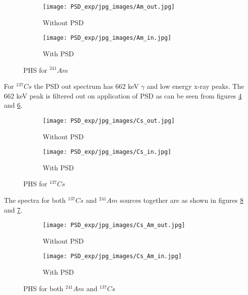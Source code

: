 \documentclass[10pt]{article}
\begin{document}
\begin{figure}[ht]
	\begin{subfigure}{0.5\textwidth}
		\centering
		\texttt{[image: PSD\_exp/jpg\_images/Am\_out.jpg]}         
		\caption{Without PSD}
		\label{Am_out}
	\end{subfigure}
	\begin{subfigure}{0.5\textwidth}
		\centering
		\texttt{[image: PSD\_exp/jpg\_images/Am\_in.jpg]}         
		\caption{With PSD}
		\label{Am_in}
		
	\end{subfigure}   
	\caption{PHS for $^{241}Am$}
\end{figure}

{For $^{137}Cs$ the PSD out spectrum has 662 keV $\gamma$ and low energy x-ray peaks. The 662 keV peak is filtered out on application of PSD as can be seen from figures \ref{Cs_out} and \ref{Cs_in}}.  
\begin{figure}[ht]
	\begin{subfigure}{0.5\textwidth}
		\centering
		\texttt{[image: PSD\_exp/jpg\_images/Cs\_out.jpg]}         
		\caption{Without PSD}
		\label{Cs_out}
	\end{subfigure}
	\begin{subfigure}{0.5\textwidth}
		\centering
		\texttt{[image: PSD\_exp/jpg\_images/Cs\_in.jpg]}         
		\caption{With PSD}
		\label{Cs_in}
		
	\end{subfigure}   
	\caption{PHS for $^{137}Cs$}
\end{figure}
The spectra for both $^{137}Cs$ and $^{241}Am$ sources together are as shown in figures \ref{Cs_Am_out} and \ref{Cs_Am_in}.  
\begin{figure}[ht]
	\begin{subfigure}{0.5\textwidth}
        \centering
        \texttt{[image: PSD\_exp/jpg\_images/Cs\_Am\_out.jpg]}         
        \caption{Without PSD}
        \label{Cs_Am_in}
     \end{subfigure}
	\begin{subfigure}{0.5\textwidth}
        \centering
        \texttt{[image: PSD\_exp/jpg\_images/Cs\_Am\_in.jpg]}         
        \caption{With PSD}
        \label{Cs_Am_out}
        
 \end{subfigure}   
 \caption{PHS for both $^{241}Am$ and $^{137}Cs$}
 \label{combinedAnalog}
\end{figure}
\end{document}
